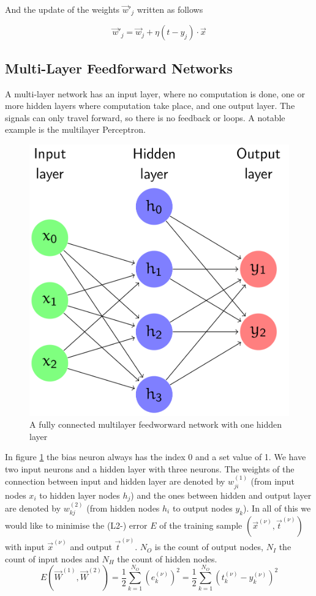 \documentclass[11pt]{article}
\begin{document}
\noindent
And the update of the weights $\vec{w}'_j$ written as follows

\begin{equation}
    \vec{w}'_j = \vec{w}_j + \eta (t - y_j)\cdot \vec{x}
\end{equation}

\subsection{Multi-Layer Feedforward Networks}
A multi-layer network has an input layer, where no computation is done, one or more hidden layers where computation take place, and one output layer. The signals can only travel forward, so there is no feedback or loops. A notable example is the multilayer Perceptron.

\begin{figure}[tbh!]
    \centering
    \includegraphics[keepaspectratio, width=0.6\linewidth]{Pictures/fully_connected_multilayer_feedforward_network}
    \caption{A fully connected multilayer feedworward network with one hidden layer}
    \label{fig:fullyconnectedmultilayerfeedforwardnetwork}
\end{figure}

In figure \ref{fig:fullyconnectedmultilayerfeedforwardnetwork} the bias neuron always has the index 0 and a set value of 1. We have two input neurons and a hidden layer with three neurons. The weights of the connection between input and hidden layer are denoted by $w_{ji}^{(1)}$ (from input nodes $x_i$ to hidden layer nodes $h_j$) and the ones between hidden and output layer are denoted by $w_{kj}^{(2)}$ (from hidden nodes $h_i$ to output nodes $y_k$). In all of this we would like to minimise the (L2-) error $E$ of the training sample $(\vec{x}^{(\nu)}, \vec{t}^{(\nu)})$ with input $\vec{x}^{(\nu)}$ and output $ \vec{t}^{(\nu)}$. $N_O$ is the count of output nodes, $N_I$ the count of input nodes and $N_H$ the count of hidden nodes.
\begin{equation}
    E\left(\vec{W}^{(1)}, \vec{W}^{(2)}\right) = \frac{1}{2} \sum_{k=1}^{N_O} \left(e_k^{(\nu)}\right)^2 = \frac{1}{2} \sum_{k=1}^{N_O} \left(t_k^{(\nu)} - y_k^{(\nu)}\right)^2
\end{equation}
\end{document}
